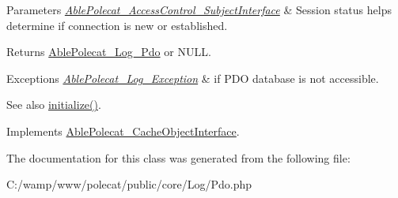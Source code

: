 \begin{DoxyParams}{Parameters}
{\em \hyperlink{interface_able_polecat___access_control___subject_interface}{Able\+Polecat\+\_\+\+Access\+Control\+\_\+\+Subject\+Interface}} & Session status helps determine if connection is new or established.\\
\hline
\end{DoxyParams}
\begin{DoxyReturn}{Returns}
\hyperlink{class_able_polecat___log___pdo}{Able\+Polecat\+\_\+\+Log\+\_\+\+Pdo} or N\+U\+L\+L. 
\end{DoxyReturn}

\begin{DoxyExceptions}{Exceptions}
{\em \hyperlink{class_able_polecat___log___exception}{Able\+Polecat\+\_\+\+Log\+\_\+\+Exception}} & if P\+D\+O database is not accessible. \\
\hline
\end{DoxyExceptions}
\begin{DoxySeeAlso}{See also}
\hyperlink{class_able_polecat___log___pdo_a91098fa7d1917ce4833f284bbef12627}{initialize()}. 
\end{DoxySeeAlso}


Implements \hyperlink{interface_able_polecat___cache_object_interface_a3f2135f6ad45f51d075657f6d20db2cd}{Able\+Polecat\+\_\+\+Cache\+Object\+Interface}.



The documentation for this class was generated from the following file\+:\begin{DoxyCompactItemize}
\item 
C\+:/wamp/www/polecat/public/core/\+Log/Pdo.\+php\end{DoxyCompactItemize}
